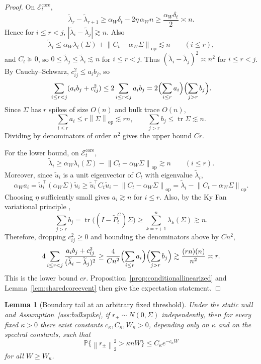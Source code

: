 \documentclass[11pt]{article}
\theoremstyle{tightplain}
\newtheorem{lemma}[theorem]{Lemma}
\theoremstyle{tightdef}
\DeclareMathOperator{\tr}{tr}
\DeclareMathOperator{\op}{op}
\newcommand{\Prob}{\mathbb P}
\newcommand{\norm}[1]{\left\lVert #1 \right\rVert}
\newcommand{\abs}[1]{\left\lvert #1 \right\rvert}
\begin{document}
\begin{proof}
On $\mathcal E_t^{\mathrm{core}}$,
\[
\widetilde\lambda_r-\widetilde\lambda_{r+1}
\ge
\alpha_W\delta_t-2\eta\,\alpha_W n
\ge
\frac{\alpha_W\delta_t}{2}
\asymp n.
\]
Hence for $i\le r<j$, $\abs{\widetilde\lambda_i-\widetilde\lambda_j}\gtrsim n$.
Also
\[
\widetilde\lambda_i
\le
\alpha_W\lambda_i(\Sigma)+\norm{C_t-\alpha_W\Sigma}_{\op}
\lesssim n
\qquad
(i\le r),
\]
and $C_t\succeq0$, so $0\le\widetilde\lambda_j\le\widetilde\lambda_i\lesssim n$
for $i\le r<j$. Thus
$(\widetilde\lambda_i-\widetilde\lambda_j)^2\asymp n^2$ for $i\le r<j$. By
Cauchy--Schwarz, $c_{ij}^2\le a_i b_j$, so
\[
\sum_{i\le r<j}(a_i b_j+c_{ij}^2)
\le
2\sum_{i\le r<j}a_i b_j
=2\Bigl(\sum_{i\le r}a_i\Bigr)\Bigl(\sum_{j>r}b_j\Bigr).
\]
Since $\Sigma$ has $r$ spikes of size $O(n)$ and bulk trace $O(n)$,
\[
\sum_{i\le r}a_i\le r\norm{\Sigma}_{\op}\lesssim rn,
\qquad
\sum_{j>r}b_j\le \tr\Sigma\lesssim n.
\]
Dividing by denominators of order $n^2$ gives the upper bound $Cr$.

For the lower bound, on $\mathcal E_t^{\mathrm{core}}$,
\[
\widetilde\lambda_i
\ge
\alpha_W\lambda_i(\Sigma)-\norm{C_t-\alpha_W\Sigma}_{\op}
\gtrsim n
\qquad
(i\le r).
\]
Moreover, since $\widetilde u_i$ is a unit eigenvector of $C_t$ with eigenvalue
$\widetilde\lambda_i$,
\[
\alpha_W a_i
=\widetilde u_i^\top(\alpha_W\Sigma)\widetilde u_i
\ge
\widetilde u_i^\top C_t\widetilde u_i-\norm{C_t-\alpha_W\Sigma}_{\op}
=\widetilde\lambda_i-\norm{C_t-\alpha_W\Sigma}_{\op}.
\]
Choosing $\eta$ sufficiently small gives $a_i\gtrsim n$ for $i\le r$. Also, by
the Ky Fan variational principle \cite[Ch.~III]{Bhatia1997},
\[
\sum_{j>r}b_j
=\tr\bigl((I-\widetilde P_t^C)\Sigma\bigr)
\ge
\sum_{k=r+1}^n\lambda_k(\Sigma)
\gtrsim n.
\]
Therefore, dropping $c_{ij}^2\ge0$ and bounding the denominators above by
$Cn^2$,
\[
4\sum_{i\le r<j}\frac{a_i b_j+c_{ij}^2}{(\widetilde\lambda_i-\widetilde\lambda_j)^2}
\ge
\frac{4}{Cn^2}\Bigl(\sum_{i\le r}a_i\Bigr)\Bigl(\sum_{j>r}b_j\Bigr)
\gtrsim
\frac{(rn)(n)}{n^2}
\asymp r.
\]
This is the lower bound $cr$. Proposition~\ref{prop:conditionallinearized} and
Lemma~\ref{lem:sharedcoreevent} then give the expectation statement.
\end{proof}

\begin{lemma}[Boundary tail at an arbitrary fixed threshold]\label{lem:tiptail}
Under the static null and Assumption~\ref{ass:bulkspike}, if
$r_\pm\sim N(0,\Sigma)$ independently, then for every fixed $\kappa>0$ there
exist constants $c_\kappa,C_\kappa,W_\kappa>0$, depending only on $\kappa$ and
on the spectral constants, such that
\[
\Prob\bigl\{\norm{r_\pm}_2^2>\kappa nW\bigr\}
\le
C_\kappa e^{-c_\kappa W}
\]
for all $W\ge W_\kappa$.
\end{lemma}
\end{document}
